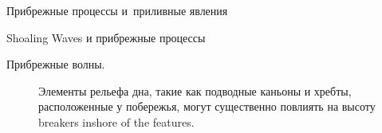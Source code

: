 \begin{chapter}{Прибрежные процессы и~приливные явления}
\begin{section}{Shoaling Waves и прибрежные процессы}
\begin{paragraph}{Прибрежные волны.}
\begin{figure}[b!]
\begin{centering}
\end{centering}
\caption{Элементы рельефа дна, такие как подводные каньоны и хребты,
расположенные у побережья, могут существенно повлиять на высоту 
breakers inshore of the features.~\cite[стр.~229]{Thurman:1985}} 
\label{wavefocusing}
\end{figure}
%
%


\end{paragraph}
\end{section}
\end{chapter}
